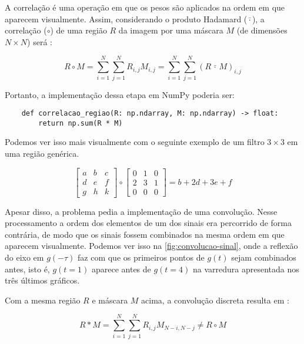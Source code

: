 A correlação é uma operação em que os pesos são aplicados na ordem em que aparecem visualmente. Assim, considerando o produto Hadamard ($\bar{\cdot}$),  a correlação ($\circ$) de uma região $R$ da imagem por uma máscara $M$ (de dimensões $N \times N$) será \autocite{ref:corrconv}:

\begin{equation*}
    R \circ M = \sum_{i = 1}^N \sum_{j = 1}^N R_{i,j} M_{i,j} = \sum_{i = 1}^N \sum_{j = 1}^N \left(R \,\bar{\cdot}\, M\right)_{i,j}
\end{equation*}

Portanto, a implementação dessa etapa em NumPy poderia ser:

\begin{verbatim}
    def correlacao_regiao(R: np.ndarray, M: np.ndarray) -> float:
        return np.sum(R * M)
\end{verbatim}

Podemos ver isso mais visualmente com o seguinte exemplo de um filtro $3 \times 3$ em uma região genérica.

\begin{equation*}
    \begin{bmatrix}
        a & b & c \\
        d & e & f \\
        g & h & k
    \end{bmatrix} \circ \begin{bmatrix}
        0 & 1 & 0 \\
        2 & 3 & 1 \\
        0 & 0 & 0
    \end{bmatrix}
    = b + 2d + 3e + f
\end{equation*}

Apesar disso, a problema pedia a implementação de uma convolução. Nesse processamento a ordem dos elementos de um dos sinais era percorrido de forma contrária, de modo que os sinais fossem combinados na mesma ordem em que aparecem visualmente. Podemos ver isso na \cref{fig:convolucao-sinal}, onde a reflexão do eixo em $g(-\tau)$ faz com que os primeiros pontos de $g(t)$ sejam combinados antes, isto é, $g(t=1)$ aparece antes de $g(t=4)$ na varredura apresentada nos três últimos gráficos.

Com a mesma região $R$ e máscara $M$ acima, a convolução discreta resulta em \autocite{ref:corrconv}:

\begin{equation*}
    R \ast M = \sum_{i = 1}^N \sum_{j = 1}^N R_{i,j} M_{N-i,N-j} \ne R \circ M
\end{equation*}

